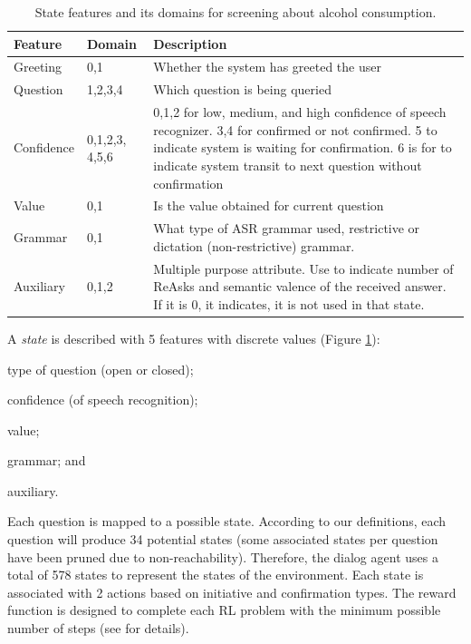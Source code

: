 \documentclass[letterpaper]{article}
\begin{document}
\begin{table}[!ht]
\caption{State features and its domains for screening about alcohol consumption.}
\label{FeaturesRepresentation}
\begin{tabular}{ | p{16mm} | p{13mm} | p{49mm} | } \hline
    \textbf{Feature} & \textbf{Domain} & \textbf{Description} \\
    \hline
    Greeting & 0,1 & Whether the system has greeted the user \\
    \hline
    Question & 1,2,3,4 & Which question is being queried \\
    \hline
    Confidence & 0,1,2,3, 4,5,6 & 0,1,2 for low, medium, and high confidence of speech 
recognizer. 3,4 for confirmed or not confirmed. 5 to indicate system is waiting for confirmation. 6 
is for to indicate system transit to next question without confirmation \\
    \hline
  Value & 0,1 & Is the value obtained for current question \\
  \hline
  Grammar & 0,1 & What type of ASR grammar used, restrictive or dictation (non-restrictive) 
grammar.  \\
    \hline
      Auxiliary & 0,1,2 & Multiple purpose attribute. Use to indicate number of ReAsks and semantic 
valence of the received answer. If it is 0, it indicates, it is not used in that state.  \\
        \hline
\end{tabular}
\end{table}


A {\em state} is described with 5 features with discrete values (Figure 
\ref{FeaturesRepresentation}): \begin{inparaenum}[1)] \item type of question (open or closed); 
\item confidence (of speech recognition); \item value; \item grammar; and \item auxiliary. \end{inparaenum} Each 
question is mapped to a possible state. According to our definitions, each question will produce 34 
potential states (some associated states per question have been pruned due to non-reachability). 
Therefore, the dialog agent uses a total of 578 states to represent the states of the environment. Each 
state is associated with 2 actions based on initiative and  confirmation types. The reward 
function is designed to complete each RL problem with the minimum possible number of steps (see \cite{YASCLL14} for details).  
\end{document}
